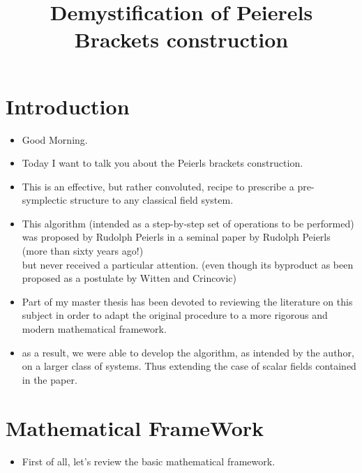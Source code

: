 \documentclass[a4paper,11pt]{scrartcl}
\title{Demystification of Peierels Brackets construction}
\author{\vspace{-5ex}}
\date{\vspace{-5ex}} %
\begin{document}

    \maketitle
    \tableofcontents

    \newpage
    \section{Introduction}
    \begin{itemize}
        \item Good Morning.
        \item Today I want to talk you about the Peierls brackets construction.
        \item This is an effective, but rather convoluted, recipe to prescribe a pre-symplectic structure to any classical field system.
        \item This algorithm (intended as a step-by-step set of operations to be performed) was proposed by Rudolph Peierls in a seminal paper by Rudolph Peierls (more than sixty years ago!) \\
        but never received a particular attention.
        (even though its byproduct as been proposed as a postulate by Witten and Crincovic)
        \item Part of my master thesis has been devoted to reviewing the literature on this subject in order to adapt the original procedure to a more rigorous and modern mathematical framework.
        \item as a result, we were able to develop the algorithm, as intended by the author, on a larger class of systems.
        Thus extending the case of scalar fields contained in the paper.
    \end{itemize}

    \newpage
    \section{Mathematical FrameWork}
    \begin{itemize}
        \item First of all, let's review the basic mathematical framework.
    \end{itemize}
\end{document}
